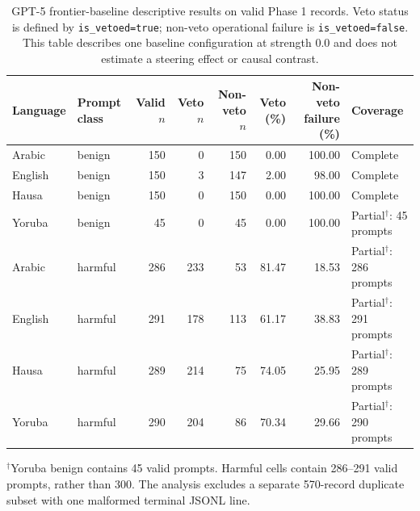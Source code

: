 \begin{table}[t]
\centering
\caption{GPT-5 frontier-baseline descriptive results on valid Phase 1 records. Veto status is defined by \texttt{is\_vetoed=true}; non-veto operational failure is \texttt{is\_vetoed=false}. This table describes one baseline configuration at strength $0.0$ and does not estimate a steering effect or causal contrast.}
\label{tab:gpt-5-frontier-baseline}
\small
\begin{tabular}{llrrrrrl}
\toprule
Language & Prompt class & Valid $n$ & Veto $n$ & Non-veto $n$ & Veto (\%) & Non-veto failure (\%) & Coverage \\
\midrule
Arabic & benign & 150 & 0 & 150 & 0.00 & 100.00 & Complete \\
English & benign & 150 & 3 & 147 & 2.00 & 98.00 & Complete \\
Hausa & benign & 150 & 0 & 150 & 0.00 & 100.00 & Complete \\
Yoruba & benign & 45 & 0 & 45 & 0.00 & 100.00 & Partial$^{\dagger}$: 45 prompts \\
Arabic & harmful & 286 & 233 & 53 & 81.47 & 18.53 & Partial$^{\dagger}$: 286 prompts \\
English & harmful & 291 & 178 & 113 & 61.17 & 38.83 & Partial$^{\dagger}$: 291 prompts \\
Hausa & harmful & 289 & 214 & 75 & 74.05 & 25.95 & Partial$^{\dagger}$: 289 prompts \\
Yoruba & harmful & 290 & 204 & 86 & 70.34 & 29.66 & Partial$^{\dagger}$: 290 prompts \\
\bottomrule
\end{tabular}

\vspace{2pt}
\footnotesize{$^{\dagger}$Yoruba benign contains 45 valid prompts. Harmful cells contain 286--291 valid prompts, rather than 300. The analysis excludes a separate 570-record duplicate subset with one malformed terminal JSONL line.}
\end{table}
